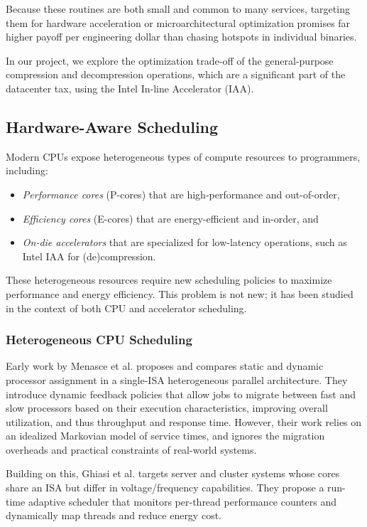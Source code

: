 Because these routines are both small and common to many services, targeting them for hardware acceleration or microarchitectural optimization promises far higher payoff per engineering dollar than chasing hotspots in individual binaries.

In our project, we explore the optimization trade-off of the general-purpose compression and decompression operations, which are a significant part of the datacenter tax, using the Intel In-line Accelerator (IAA).

\subsection{Hardware-Aware Scheduling}

Modern CPUs expose heterogeneous types of compute resources to programmers, including:
\begin{itemize}
  \item \emph{Performance cores} (P-cores) that are high-performance and out-of-order,
  \item \emph{Efficiency cores} (E-cores) that are energy-efficient and in-order, and
  \item \emph{On-die accelerators} that are specialized for low-latency operations, such as Intel IAA for (de)compression.
\end{itemize}
These heterogeneous resources require new scheduling policies to maximize performance and energy efficiency.
This problem is not new; it has been studied in the context of both CPU and accelerator scheduling.

\subsubsection{Heterogeneous CPU Scheduling}

Early work by Menasce et al. \cite{menasceStaticDynamic1995} proposes and compares static and dynamic processor assignment in a single-ISA heterogeneous parallel architecture.
They introduce dynamic feedback policies that allow jobs to migrate between fast and slow processors based on their execution characteristics, improving overall utilization, and thus throughput and response time.
However, their work relies on an idealized Markovian model of service times, and ignores the migration overheads and practical constraints of real-world systems.

Building on this, Ghiasi et al. \cite{ghiasiSchedulingHeterogeneous2005} targets server and cluster systems whose cores share an ISA but differ in voltage/frequency capabilities.
They propose a run-time adaptive scheduler that monitors per-thread performance counters and dynamically map threads and reduce energy cost.

